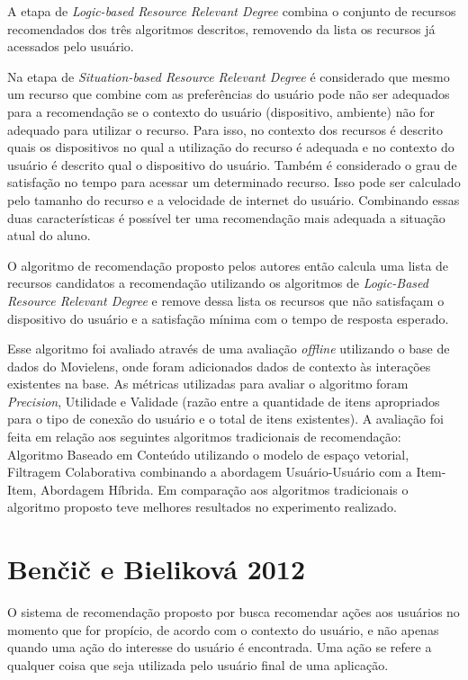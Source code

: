 A etapa de \textit{Logic-based Resource Relevant Degree} combina o conjunto de recursos recomendados dos três algoritmos
descritos, removendo da lista os recursos já acessados pelo usuário.

Na etapa de \textit{Situation-based Resource Relevant Degree} é considerado que mesmo um recurso que combine com as preferências
do usuário pode não ser adequados para a recomendação se o contexto do usuário (dispositivo, ambiente) não for adequado
para utilizar o recurso. Para isso, no contexto dos recursos é descrito quais os dispositivos no qual a utilização do
recurso é adequada e no contexto do usuário é descrito qual o dispositivo do usuário. Também é considerado o grau de
satisfação no tempo para acessar um determinado recurso. Isso pode ser calculado pelo tamanho do recurso e a velocidade
de internet do usuário. Combinando essas duas características é possível ter uma recomendação mais adequada a situação
atual do aluno.

O algoritmo de recomendação proposto pelos autores então calcula uma lista de recursos candidatos a recomendação
utilizando os algoritmos de \textit{Logic-Based Resource Relevant Degree} e remove dessa lista os recursos que não satisfaçam o
dispositivo do usuário e a satisfação mínima com o tempo de resposta esperado.

Esse algoritmo foi avaliado através de uma avaliação \textit{offline} utilizando o base de dados do Movielens, onde foram adicionados dados de
contexto às interações existentes na base. As métricas utilizadas para avaliar o algoritmo foram \textit{Precision}, Utilidade e
Validade (razão entre a quantidade de itens apropriados para o tipo de conexão do usuário e o total de itens existentes).
A avaliação foi feita em relação aos seguintes  algoritmos tradicionais de recomendação: Algoritmo Baseado em Conteúdo
utilizando o modelo de espaço vetorial, Filtragem Colaborativa combinando a abordagem Usuário-Usuário com a Item-Item, Abordagem
Híbrida. Em comparação aos algoritmos tradicionais o algoritmo proposto teve melhores resultados no
experimento realizado.

\section{Benčič e Bieliková 2012}

O sistema de recomendação proposto por  busca recomendar ações aos usuários no momento que
for propício, de acordo com o contexto do usuário, e não apenas quando uma ação do interesse do usuário é encontrada.
Uma ação se refere a qualquer coisa que seja utilizada pelo usuário final de uma aplicação.

